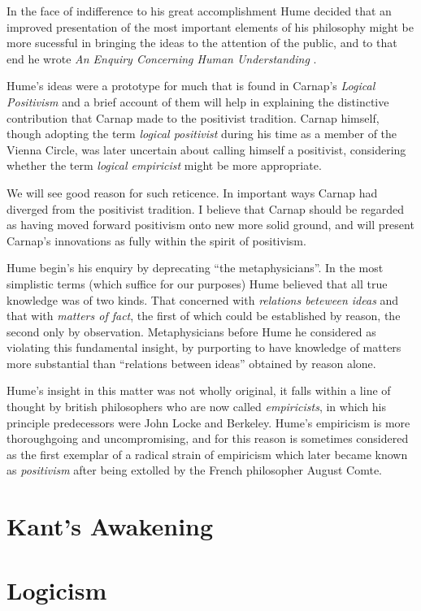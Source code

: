 In the face of indifference to his great accomplishment Hume decided that
an improved presentation of the most important elements of his philosophy
might be more sucessful in bringing the ideas to the attention of the
public, and to that end he wrote \emph{An Enquiry Concerning Human Understanding} \cite{hume48}.

Hume's ideas were a prototype for much that is found in Carnap's
\emph{Logical Positivism} and a brief account of them will help in explaining the distinctive
contribution that Carnap made to the positivist tradition.
Carnap himself, though adopting the term \emph{logical positivist} during his time as
a member of the Vienna Circle, was later uncertain about calling himself a positivist,
considering whether the term \emph{logical empiricist} might be more appropriate.

We will see good reason for such reticence.
In important ways Carnap had diverged from the positivist tradition.
I believe that Carnap should be regarded as having moved forward positivism onto new more solid ground, and will present Carnap's innovations as fully within the spirit of positivism.

Hume begin's his enquiry by deprecating ``the metaphysicians''.
In the most simplistic terms (which suffice for our purposes) Hume believed that all true knowledge was of two kinds.
That concerned with {\it relations beteween ideas} and that with {\it matters of fact}, the first of which could be established by reason, the second only by observation.
Metaphysicians before Hume he considered as violating this fundamental insight, by purporting to have knowledge of matters more substantial than ``relations between ideas'' obtained by reason alone.

Hume's insight in this matter was not wholly original, it falls within a line of thought by british philosophers who are now called {\it empiricists}, in which his principle predecessors were John Locke and Berkeley.
Hume's empiricism is more thoroughgoing and uncompromising, and for this reason is sometimes considered as the first exemplar of a radical strain of empiricism which later became known as {\it positivism} after being extolled by the French philosopher August Comte.



\section{Kant's Awakening}

\section{Logicism}

